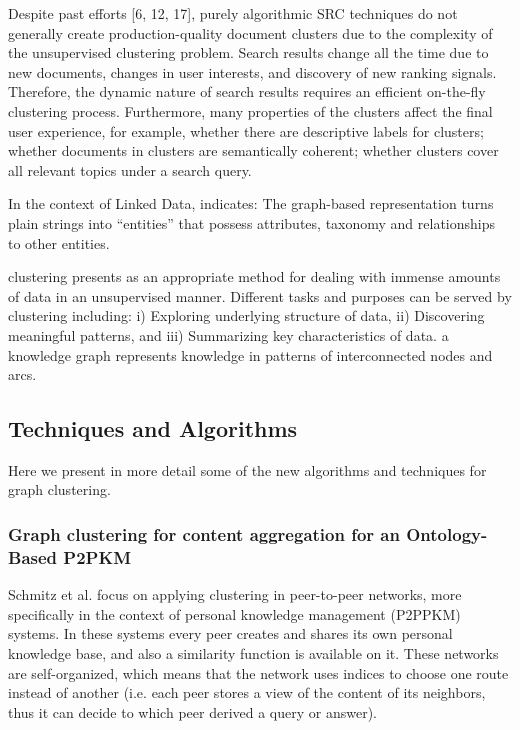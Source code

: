\documentclass[runningheads]{llncs}
\begin{document}

Despite past efforts [6, 12, 17], purely algorithmic SRC techniques do not generally create production-quality document clusters due to the complexity of the unsupervised clustering problem. Search results change all the time due to new documents, changes in user interests, and discovery of new ranking signals. Therefore, the dynamic nature of search results requires an efficient on-the-fly clustering process. Furthermore, many properties of the clusters affect the final user experience, for example, whether there are descriptive labels for clusters; whether documents in clusters are semantically coherent; whether clusters cover all relevant topics under a search query. \cite{Chang}

In the context of Linked Data, \cite{Elbattah} indicates: The graph-based representation turns plain strings into “entities” that possess attributes, taxonomy and relationships to other entities. 

clustering presents as an appropriate method for dealing with immense amounts of data in an unsupervised manner. \cite{Elbattah}
Different tasks and purposes can be served by clustering including: i) Exploring underlying structure of data, ii) Discovering meaningful patterns, and iii) Summarizing key characteristics of data. \cite{Elbattah}
a knowledge graph represents knowledge in patterns of interconnected nodes and arcs. \cite{Elbattah}

\subsection{Techniques and Algorithms}\label{algorithms}
Here we present in more detail some of the new algorithms and techniques for graph clustering.

\subsubsection{Graph clustering for content aggregation for an Ontology-Based P2PKM}\label{content-aggregation}
Schmitz et al. \cite{Schmitz} focus on applying clustering in peer-to-peer networks, more specifically in the context of personal knowledge management (P2PPKM) systems. In these systems every peer creates and shares its own personal knowledge base, and also a similarity function is available on it. These networks are self-organized, which means that the network uses indices to choose one route instead of another (i.e. each peer stores a view of the content of its neighbors, thus it can decide to which peer derived a query or answer).
\end{document}
